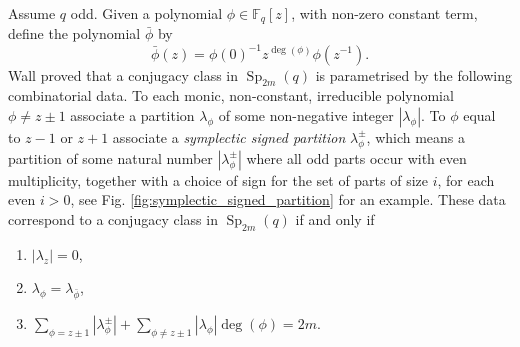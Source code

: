 \documentclass[a4paper, 12pt, oneside]{amsart}
\theoremstyle{definition}
\DeclareMathOperator{\Sp}{Sp}
\begin{document}
Assume $q$ odd. Given a polynomial $\phi \in \mathbb{F}_q[z]$, with non-zero constant term, define the polynomial $\bar{\phi}$ by
\begin{equation}
\label{bar_phi}
\bar{\phi}(z)=\phi(0)^{-1}z^{\deg(\phi)}\phi(z^{-1}).
\end{equation}
Wall \cite{Wall} proved that a conjugacy class in $\Sp_{2m}(q)$ is parametrised by the following combinatorial data. To each monic, non-constant, irreducible polynomial $\phi \neq z\pm1$ associate a partition $\lambda_{\phi}$ of some non-negative integer $|\lambda_{\phi}|$. To $\phi$ equal to $z-1$ or $z+1$ associate a \textit{symplectic signed partition} $\lambda_{\phi}^{\pm}$, which means a partition of some natural number $|\lambda^{\pm}_{\phi}|$ where all odd parts occur with even multiplicity, together with a choice of sign for the set of parts of size $i$, for each even $i>0$, see Fig. \ref{fig:symplectic_signed_partition} for an example.
These data correspond to a conjugacy class in $\Sp_{2m}(q)$ if and only if 
\begin{enumerate}[label=(\roman*)]
    \item $|\lambda_z|=0$,
    \item $\lambda_{\phi}=\lambda_{\bar{\phi}}$,
    \item $\sum_{\phi=z\pm1}|\lambda_{\phi}^{\pm}|+\sum_{\phi \neq z \pm1}|\lambda_{\phi}|\deg (\phi)=2m$.
\end{enumerate}
\end{document}
